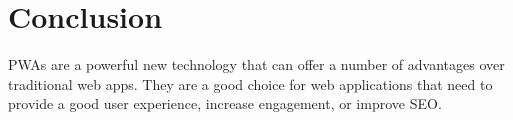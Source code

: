 \documentclass{report}
\begin{document}
\section{Conclusion}\label{Conclusion}
PWAs are a powerful new technology that can offer a number of advantages over traditional web apps. They are a good choice for web applications that need to provide a good user experience, increase engagement, or improve SEO.




%

\end{document}
